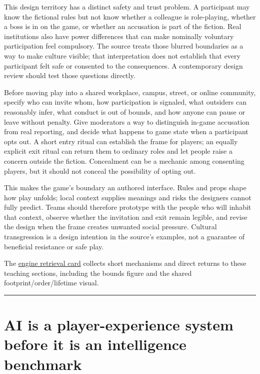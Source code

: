 This design territory has a distinct safety and trust problem. A participant may know the fictional rules but not know whether a colleague is role-playing, whether a boss is in on the game, or whether an accusation is part of the fiction. Real institutions also have power differences that can make nominally voluntary participation feel compulsory. The source treats those blurred boundaries as a way to make culture visible; that interpretation does not establish that every participant felt safe or consented to the consequences. A contemporary design review should test those questions directly.

Before moving play into a shared workplace, campus, street, or online community, specify who can invite whom, how participation is signaled, what outsiders can reasonably infer, what conduct is out of bounds, and how anyone can pause or leave without penalty. Give moderators a way to distinguish in-game accusation from real reporting, and decide what happens to game state when a participant opts out. A short entry ritual can establish the frame for players; an equally explicit exit ritual can return them to ordinary roles and let people raise a concern outside the fiction. Concealment can be a mechanic among consenting players, but it should not conceal the possibility of opting out.

This makes the game's boundary an authored interface. Rules and props shape how play unfolds; local context supplies meanings and risks the designers cannot fully predict. Teams should therefore prototype with the people who will inhabit that context, observe whether the invitation and exit remain legible, and revise the design when the frame creates unwanted social pressure. Cultural transgression is a design intention in the source's examples, not a guarantee of beneficial resistance or safe play.

The \hyperref[appendix-64ea716dcadc]{engine retrieval card} collects short mechanisms and direct returns to these teaching sections, including the bounds figure and the shared footprint/order/lifetime visual.

\begin{center}\rule{0.5\linewidth}{0.5pt}\end{center}

\section{AI is a player-experience system before it is an intelligence benchmark}\label{06-engine-ii-ch047-ai-is-a-player-experience-system-before-it-is-an-intelligence-benchmark}

